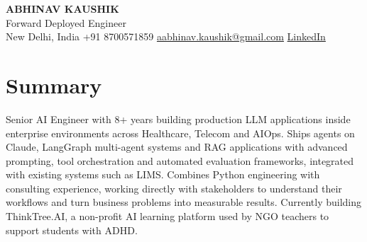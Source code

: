 \documentclass[10pt,a4paper]{article}
\begin{document}
\begin{center}
  {\LARGE\bfseries ABHINAV KAUSHIK}\\[2pt]
  {\large Forward Deployed Engineer}\\[2pt]
  New Delhi, India \textbar{} +91 8700571859 \textbar{} \href{mailto:aabhinav.kaushik@gmail.com}{aabhinav.kaushik@gmail.com} \textbar{} \href{https://www.linkedin.com/in/abhinav-kaushik10/}{LinkedIn}  
\end{center}

\section{Summary}
Senior AI Engineer with 8+ years building production LLM applications inside enterprise environments across Healthcare, Telecom and AIOps. Ships agents on Claude, LangGraph multi-agent systems and RAG applications with advanced prompting, tool orchestration and automated evaluation frameworks, integrated with existing systems such as LIMS. Combines Python engineering with consulting experience, working directly with stakeholders to understand their workflows and turn business problems into measurable results. Currently building ThinkTree.AI, a non-profit AI learning platform used by NGO teachers to support students with ADHD.
\end{document}
